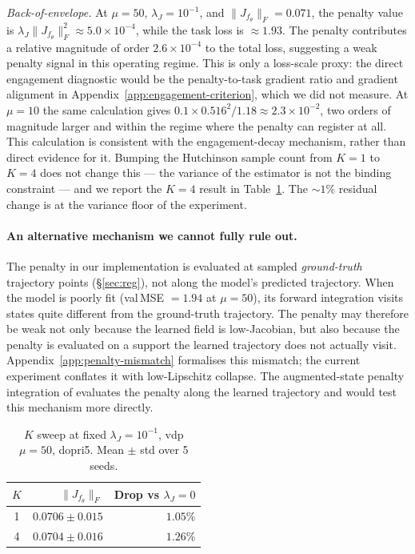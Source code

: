 \documentclass[11pt]{article}
\theoremstyle{plain}
\theoremstyle{definition}
\newcommand{\fjac}{J_{f_\theta}}
\begin{document}
\emph{Back-of-envelope.} At $\mu = 50$, $\lambda_J = 10^{-1}$, and
$\|\fjac\|_F = 0.071$, the penalty value is $\lambda_J \|\fjac\|_F^2 \approx
5.0 \times 10^{-4}$, while the task loss is $\approx 1.93$. The penalty
contributes a relative magnitude of order $2.6 \times 10^{-4}$ to the total
loss, suggesting a weak penalty signal in this operating regime. This is only
a loss-scale proxy: the direct engagement diagnostic would be the
penalty-to-task gradient ratio and gradient alignment in
Appendix~\ref{app:engagement-criterion}, which we did not measure. At
$\mu = 10$ the same calculation gives
$0.1 \times 0.516^2 / 1.18 \approx 2.3 \times 10^{-2}$, two orders of
magnitude larger and within the regime where the penalty can register at all.
This calculation is consistent with the engagement-decay mechanism, rather than
direct evidence for it.
Bumping the Hutchinson sample
count from $K = 1$ to $K = 4$ does not change this --- the variance of the
estimator is not the binding constraint --- and we report the $K = 4$ result
in Table~\ref{tab:k4}. The $\sim 1\%$ residual change is at the variance
floor of the experiment.

\paragraph{An alternative mechanism we cannot fully rule out.}
The penalty in our implementation is evaluated at sampled \emph{ground-truth}
trajectory points (\S\ref{sec:reg}), not along the model's predicted
trajectory. When the model is poorly fit (val\,MSE $= 1.94$ at $\mu = 50$),
its forward integration visits states quite different from the ground-truth
trajectory. The penalty may therefore be weak not only because the learned
field is low-Jacobian, but also because the penalty is evaluated on a support
the learned trajectory does not actually visit.
Appendix~\ref{app:penalty-mismatch} formalises this mismatch; the current
experiment conflates it with low-Lipschitz collapse. The augmented-state
penalty integration of \citet{finlay2020train} evaluates the penalty along the
learned trajectory and would test this mechanism more directly.

\begin{table}[t]
\centering
\caption{$K$ sweep at fixed $\lambda_J = 10^{-1}$, vdp $\mu = 50$, dopri5.
  Mean $\pm$ std over 5 seeds.}
\label{tab:k4}
\begin{tabular}{c r r}
\toprule
$K$ & $\|\fjac\|_F$ & Drop vs $\lambda_J = 0$ \\
\midrule
1 & $0.0706 \pm 0.015$ & $1.05\%$ \\
4 & $0.0704 \pm 0.016$ & $1.26\%$ \\
\bottomrule
\end{tabular}
\end{table}
\end{document}

